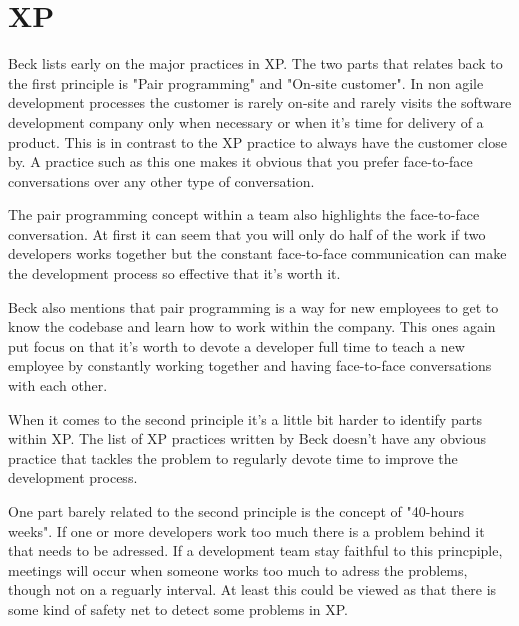 \newpage
\section{XP}
Beck \cite{beck99} lists early on the major practices in XP. The two parts that relates back to the
first principle is "Pair programming" and "On-site customer". In non agile
development processes the customer is rarely on-site and rarely visits the
software development company only when necessary or when it's time for
delivery of a product. This is in contrast to the XP practice to always have
the customer close by. A practice such as this one makes it obvious that you
prefer face-to-face conversations over any other type of conversation.

The pair programming concept within a team also highlights the face-to-face
conversation. At first it can seem that you will only do half of the work if
two developers works together but the constant face-to-face communication can make
the development process so effective that it's worth it.

Beck also mentions that pair programming is a way for new employees to get to
know the codebase and learn how to work within the company. This ones again put
focus on that it's worth to devote a developer full time to teach a new
employee by constantly working together and having face-to-face conversations with each
other.

When it comes to the second principle it's a little bit harder to identify
parts within XP. The list of XP practices written by Beck \cite{beck99} doesn't
have any obvious practice that tackles the problem to regularly devote time to
improve the development process.

One part barely related to the second principle is the concept of "40-hours weeks". If
one or more developers work too much there is a problem behind it that needs to
be adressed. If a development team stay faithful to this princpiple, meetings
will occur when someone works too much to adress the problems, though not
on a reguarly interval. At least this could be viewed as that there is some kind of safety net to
detect some problems in XP.
